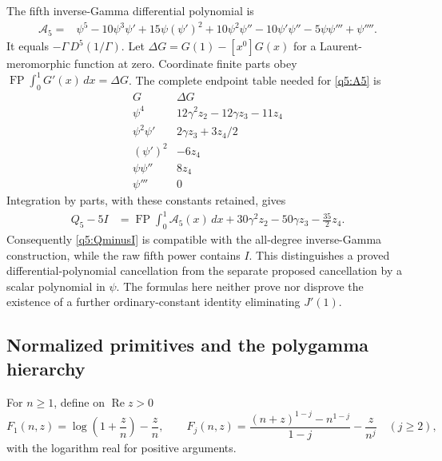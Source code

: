 The fifth inverse-Gamma differential polynomial is
\begin{align}\label{q5:A5}
 \mathcal A_5
 ={}&\psi^5-10\psi^3\psi'+15\psi(\psi')^2+10\psi^2\psi''
            -10\psi'\psi''-5\psi\psi'''+\psi''''.
\end{align}
It equals $-\Gamma\,D^5(1/\Gamma)$.
Let $\Delta G=G(1)-[x^0]G(x)$ for a Laurent-meromorphic function
at zero.  Coordinate finite parts obey
$\operatorname{FP}\int_0^1G'(x)\,dx=\Delta G$.
The complete endpoint table needed for \eqref{q5:A5} is
\begin{equation}\label{q5:endpoints}
\begin{array}{c|c}
G&\Delta G\\\hline
\psi^4&12\gamma^2z_2-12\gamma z_3-11z_4\\
\psi^2\psi'&2\gamma z_3+3z_4/2\\
(\psi')^2&-6z_4\\
\psi\psi''&8z_4\\
\psi'''&0
\end{array}
\end{equation}
Integration by parts, with these constants retained, gives
\begin{align}\label{q5:Bell-explanation}
 Q_5-5I
   &=\operatorname{FP}\int_0^1\mathcal A_5(x)\,dx
       +30\gamma^2z_2-50\gamma z_3-\frac{35}{2}z_4.
\end{align}
Consequently \eqref{q5:QminusI} is compatible with the all-degree
inverse-Gamma construction, while the raw fifth power contains $I$.
This distinguishes a proved differential-polynomial cancellation from
the separate proposed cancellation by a scalar polynomial in $\psi$.
The formulas here neither prove nor disprove the existence of a further
ordinary-constant identity eliminating $J'(1)$.

\subsection{Normalized primitives and the polygamma hierarchy}

For $n\geq1$, define on $\operatorname{Re}z>0$
\[
 F_1(n,z)=\log\left(1+\frac zn\right)-\frac zn,
 \qquad
 F_j(n,z)=\frac{(n+z)^{1-j}-n^{1-j}}{1-j}-\frac z{n^j}
 \quad(j\geq2),
\]
with the logarithm real for positive arguments.

